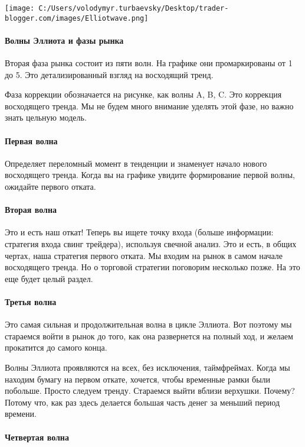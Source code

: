 \documentclass[a5paper]{article}
\begin{document}
\texttt{[image: C:/Users/volodymyr.turbaevsky/Desktop/trader-blogger.com/images/Elliotwave.png]}

\paragraph{Волны Эллиота и фазы рынка}

Вторая фаза рынка состоит из пяти волн. На графике они промаркированы от 1 до 5. Это детализированный взгляд на восходящий тренд.

Фаза коррекции обозначается на рисунке, как волны A, B, C. Это
коррекция восходящего тренда. Мы не будем много внимание уделять этой
фазе, но важно знать цельную модель.

\paragraph{Первая волна}

Определяет переломный момент в тенденции и знаменует начало нового
восходящего тренда. Когда вы на графике увидите формирование первой
волны, ожидайте первого отката.

\paragraph{Вторая волна }

Это и есть наш откат! Теперь вы ищете точку входа (больше информации:
стратегия входа свинг трейдера), используя свечной анализ. Это и есть,
в общих чертах, наша стратегия первого отката. Мы входим на рынок в
самом начале восходящего тренда. Но о торговой стратегии поговорим
несколько позже. На это еще будет целый раздел.

\paragraph{Третья волна}

Это самая сильная и продолжительная волна в цикле Эллиота. Вот поэтому мы стараемся войти в рынок до того, как она развернется на полный ход, и желаем прокатится до самого конца.

Волны Эллиота проявляются на всех, без исключения, таймфреймах. Когда
мы находим бумагу на первом откате, хочется, чтобы временные рамки
были побольше. Просто следуем тренду. Стараемся выйти вблизи
верхушки. Почему? Потому что, как раз здесь делается большая часть
денег за меньший период времени.

\paragraph{Четвертая волна}
\end{document}
